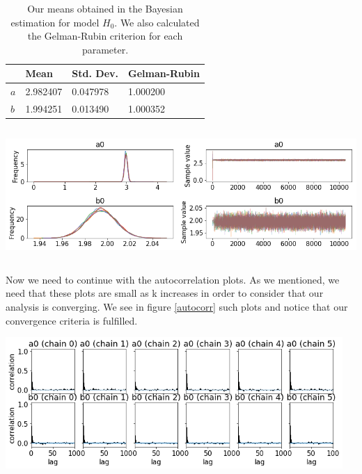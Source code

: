 \documentclass[onecolumn,           %
               showpacs,            %
               preprintnumbers,     %
               aps,                 %
               prl,          	    %
               letterpaper,             %
               superscriptaddress,      %
               nofootinbib,         %
               tightenlines,        %
               floats,floatfix      %
               ,usenatbib,
               ]{revtex4-1}
\begin{document}
\begin{table}[h!]
\centering
\begin{tabular}{||l|l|l|l||} 
 \hline
 & \textbf{Mean} & \textbf{Std. Dev.} & \textbf{Gelman-Rubin} \\ [0.5ex] 
 \hline\hline
$a$ & 2.982407 & 0.047978 & 1.000200 \\
\hline
$b$ & 1.994251 & 0.013490 & 1.000352\\ [1ex] 
 \hline
\end{tabular}
\caption{\footnotesize{Our means obtained in the Bayesian estimation for model $H_0$. We also calculated the Gelman-Rubin criterion for each parameter.}}
\label{tabla1}
\end{table}

\begin{minipage}{\textwidth}
\centering
\includegraphics[height=5cm]{Figures/chain_new.png}
\label{chain}
\end{minipage}

Now we need to continue with the autocorrelation plots. As we mentioned, we need that these plots are small as k increases in order to consider that our analysis is converging. We see in figure \ref{autocorr} such plots and notice that our convergence criteria is fulfilled.

\begin{minipage}{\textwidth}
\centering
\includegraphics[height=5cm]{Figures/autocorr_1.png}
\label{autocorr}
\end{minipage}
\\$ $
\end{document}
